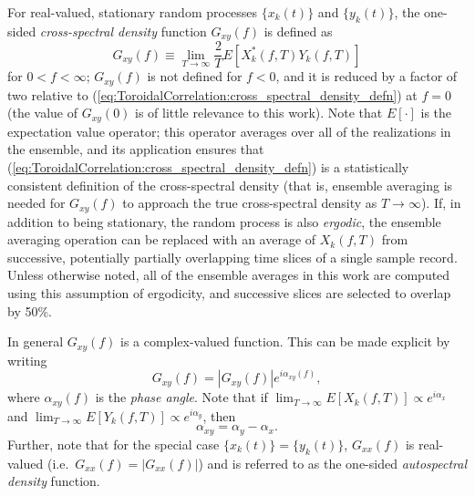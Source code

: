 For real-valued, stationary random processes $\{x_k(t)\}$ and $\{y_k(t)\}$,
the one-sided \emph{cross-spectral density} function $G_{xy}(f)$ is defined as
\begin{equation}
  G_{xy}(f)
  \equiv
  \lim_{T \rightarrow \infty}
  \frac{2}{T} E \left[ X_k^*(f, T) Y_k(f, T) \right]
  \label{eq:ToroidalCorrelation:cross_spectral_density_defn}
\end{equation}
for $0 < f < \infty$;
$G_{xy}(f)$ is not defined for $f < 0$, and
it is reduced by a factor of two relative to
(\ref{eq:ToroidalCorrelation:cross_spectral_density_defn}) at $f = 0$
(the value of $G_{xy}(0)$ is of little relevance to this work).
Note that $E[\cdot]$ is the expectation value operator;
this operator averages over all of the realizations in the ensemble, and
its application ensures that
(\ref{eq:ToroidalCorrelation:cross_spectral_density_defn})
is a statistically consistent definition of the cross-spectral density
(that is, ensemble averaging is needed for $G_{xy}(f)$
to approach the true cross-spectral density
as $T \rightarrow \infty$). %
If, in addition to being stationary, the random process is also \emph{ergodic},
the ensemble averaging operation can be replaced
with an average of $X_k(f, T)$ from successive,
potentially partially overlapping time slices
of a single sample record.
Unless otherwise noted,
all of the ensemble averages in this work are computed
using this assumption of ergodicity, and
successive slices are selected to overlap by 50\%.

In general $G_{xy}(f)$ is a complex-valued function.
This can be made explicit by writing
\begin{equation}
  G_{xy}(f) = \left| G_{xy}(f) \right| e^{i \alpha_{xy}(f)},
  \label{eq:ToroidalCorrelation:cross_spectral_density_explicit_complex}
\end{equation}
where $\alpha_{xy}(f)$ is the \emph{phase angle}.
Note that if
$\lim_{T \rightarrow \infty} E[X_k(f, T)] \propto e^{i \alpha_x}$ and
$\lim_{T \rightarrow \infty} E[Y_k(f, T)] \propto e^{i \alpha_y}$, then
\begin{equation}
  \alpha_{xy} = \alpha_y - \alpha_x.
\end{equation}
Further, note that for the special case $\{x_k(t)\} = \{y_k(t)\}$,
$G_{xx}(f)$ is real-valued (i.e.\ $G_{xx}(f) = |G_{xx}(f)|$) and
is referred to as the one-sided \emph{autospectral density} function.


